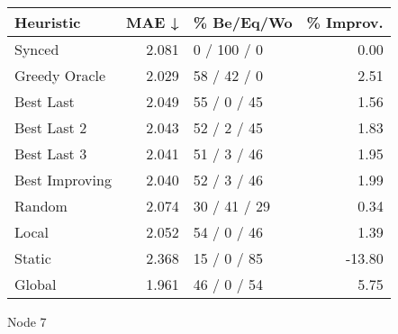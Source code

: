 \begin{tabular}{lrlr}
\toprule
\textbf{Heuristic} & \textbf{MAE ↓} & \textbf{\% Be/Eq/Wo} & \textbf{\% Improv.} \\
\midrule
            Synced &          2.081 &          0 / 100 / 0 &                0.00 \\
     Greedy Oracle &          2.029 &          58 / 42 / 0 &                2.51 \\
         Best Last &          2.049 &          55 / 0 / 45 &                1.56 \\
       Best Last 2 &          2.043 &          52 / 2 / 45 &                1.83 \\
       Best Last 3 &          2.041 &          51 / 3 / 46 &                1.95 \\
    Best Improving &          2.040 &          52 / 3 / 46 &                1.99 \\
            Random &          2.074 &         30 / 41 / 29 &                0.34 \\
             Local &          2.052 &          54 / 0 / 46 &                1.39 \\
            Static &          2.368 &          15 / 0 / 85 &              -13.80 \\
            Global &          1.961 &          46 / 0 / 54 &                5.75 \\
\bottomrule
\end{tabular}
\caption{Node 7}
\label{tab:ds_non_lr01_le1_bs4_7}
